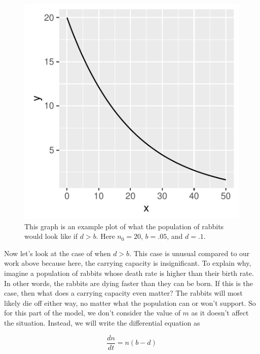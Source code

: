 \documentclass{article}\usepackage[]{graphicx}\usepackage[]{color}
\makeatletter
\def\maxwidth{ %
  \ifdim\Gin@nat@width>\linewidth
    \linewidth
  \else
    \Gin@nat@width
  \fi
}
\newenvironment{knitrout}{}{} %
\makeatother
\begin{document}
\begin{figure}
\begin{knitrout}
\color{fgcolor}

{\centering \includegraphics[width=\maxwidth]{figure/unnamed-chunk-4-1} 

}



\end{knitrout}
\caption{This graph is an example plot of what the population of rabbits would look like if \(d > b\). Here \(n_0 = 20\), \(b = .05\), and \(d = .1\).}
\end{figure}

Now let's look at the case of when \(d > b\). This case is unusual compared to our work above because here, the carrying capacity is insignificant. To explain why, imagine a population of rabbits whose death rate is higher than their birth rate. In other words, the rabbits are dying faster than they can be born. If this is the case, then what does a carrying capacity even matter? The rabbits will most likely die off either way, no matter what the population can or won't support. So for this part of the model, we don't consider the value of \(m\) as it doesn't affect the situation. Instead, we will write the differential equation as 

\begin{equation}
\frac{dn}{dt} = n(b-d)
\end {equation}
\end{document}
